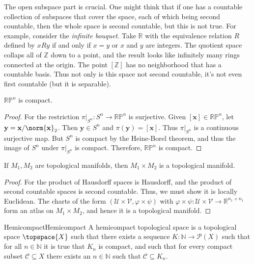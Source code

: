         The open subspace part is crucial. One might think that if one has a
        countable collection of subspaces that cover the space, each of which
        being second countable, then the whole space is second countable, but
        this is not true. For example, consider the \textit{infinite bouquet}.
        Take $\mathbb{R}$ with the equivalence relation $R$ defined by
        $xRy$ if and only if $x=y$ or $x$ and $y$ are integers. The quotient
        space collaps all of $\mathbb{Z}$ down to a point, and the result looks
        like infinitely many rings connected at the origin. The point
        $[\mathbb{Z}]$ has no neighborhood that has a countable basis. Thus not
        only is this space not second countable, it's not even first countable
        (but it is separable).
        \begin{theorem}
            $\mathbb{RP}^{n}$ is compact.
        \end{theorem}
        \begin{proof}
            For the restriction $\pi|_{S^{n}}:S^{n}\rightarrow\mathbb{RP}^{n}$
            is surjective. Given $[\mathbf{x}]\in\mathbb{RP}^{n}$, let
            $\mathbf{y}=\mathbf{x}/\norm{\mathbf{x}}_{2}$. Then
            $\mathbf{y}\in{S}^{n}$ and $\pi(\mathbf{y})=[\mathbf{x}]$. Thus
            $\pi|_{S^{n}}$ is a continuous surjective map. But $S^{n}$ is
            compact by the Heine-Borel theorem, and thus the image of
            $S^{n}$ under $\pi|_{S^{n}}$ is compact. Therefore,
            $\mathbb{RP}^{n}$ is compact.
        \end{proof}
        \begin{theorem}
            If $M_{1},M_{2}$ are topological manifolds, then
            $M_{1}\times{M}_{2}$ is a topological manifold.
        \end{theorem}
        \begin{proof}
            For the product of Hausdorff spaces is Hausdorff, and the product
            of second countable spaces is second countable. Thus, we must show
            it is locally Euclidean. The charts of the form
            $(\mathcal{U}\times\mathcal{V},\varphi\times\psi)$ with
            $\varphi\times\psi:\mathcal{U}\times\mathcal{V}%
             \rightarrow\mathbb{R}^{n_{1}+n_{1}}$ form an atlas on
            $M_{1}\times{M}_{2}$, and hence it is a topological manifold.
        \end{proof}
        \begin{fdefinition}{Hemicompact}{Hemicompact}
            A hemicompact topological space is a topological space
            $\topspace{X}$ such that there exists a sequence
            $K:\mathbb{N}\rightarrow\mathcal{P}(X)$ such that for all
            $n\in\mathbb{N}$ it is true that $K_{n}$ is compact, and such that
            for every compact subset $\mathcal{C}\subseteq{X}$ there exists an
            $n\in\mathbb{N}$ such that $\mathcal{C}\subseteq{K}_{n}$.
        \end{fdefinition}
